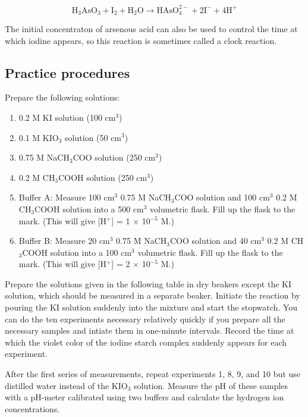 \begin{equation}
\text{H}_{3}\text{AsO}_{3} + \text{I}_{2} + \text{H}_{2}\text{O}  \longrightarrow \text{HAsO}_{4}^{2-} +  2 \text{I}^{-}  + 4 \text{H}^{+}
\end{equation}

The initial concentraton of arsenous acid can also be used to control the time at which iodine appears, so this reaction is sometimes called a clock reaction.


\subsection{Practice procedures}

Prepare the following solutions:

\begin{enumerate}
\item 0.2 M KI solution (100 cm$^3$)
\item 0.1 M KIO$_3$ solution (50 cm$^3$)
\item 0.75 M NaCH$_3$COO solution (250 cm$^3$)
\item 0.2 M CH$_3$COOH solution (250 cm$^3$)
\item Buffer A: Measure 100 cm$^3$ 0.75 M NaCH$_3$COO solution and 100 cm$^3$ 0.2 M CH$_3$COOH solution into a 500 cm$^3$ volumetric flask. Fill up the flask to the mark. (This will give [H$^+$] = 1 $\times$ 10$^{-5}$ M.)
\item Buffer B: Measure 20 cm$^3$ 0.75 M NaCH$_3$COO solution and 40 cm$^3$ 0.2 M CH$_3$COOH solution into a 100 cm$^3$ volumetric flask. Fill up the flask to the mark. (This will give [H$^+$] = 2 $\times$ 10$^{-5}$ M.)
\end{enumerate}

Prepare the solutions given in the following table in dry beakers except the KI solution, which should be measured in a separate beaker. Initiate the reaction by pouring the KI solution suddenly into the mixture and start the stopwatch. You can do the ten experiments necessary relatively quickly if you prepare all the necessary samples and intiate them in one-minute intervals. Record the time at which the violet color of the iodine starch complex suddenly appears for each experiment.

After the first series of measurements, repeat experiments 1, 8, 9, and 10 but use distilled water instead of the KIO$_3$ solution. Measure the pH of these samples with a pH-meter calibrated using two buffers and calculate the hydrogen ion concentrations.

